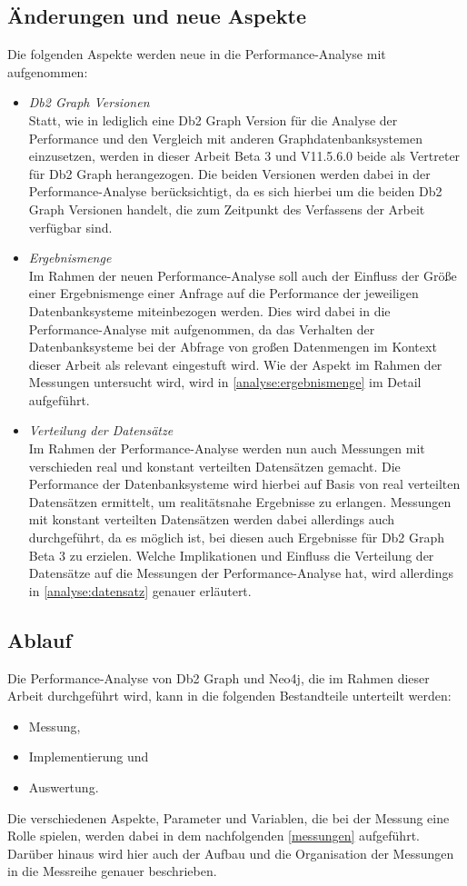\subsection{Änderungen und neue Aspekte}
Die folgenden Aspekte werden neue in die Performance-Analyse mit aufgenommen:
\begin{itemize}
    \item \textit{Db2 Graph Versionen}\\
    Statt, wie in \cite{sigmod_tian} lediglich eine Db2 Graph Version für die Analyse der Performance und den Vergleich mit anderen Graphdatenbanksystemen einzusetzen, werden in dieser Arbeit Beta 3 und V11.5.6.0 beide als Vertreter für Db2 Graph herangezogen. Die beiden Versionen werden dabei in der Performance-Analyse berücksichtigt, da es sich hierbei um die beiden Db2 Graph Versionen handelt, die zum Zeitpunkt des Verfassens der Arbeit verfügbar sind.
    \item \textit{Ergebnismenge}\\
    Im Rahmen der neuen Performance-Analyse soll auch der Einfluss der Größe einer Ergebnismenge einer Anfrage auf die Performance der jeweiligen Datenbanksysteme miteinbezogen werden. Dies wird dabei in die Performance-Analyse mit aufgenommen, da das Verhalten der Datenbanksysteme bei der Abfrage von großen Datenmengen im Kontext dieser Arbeit als relevant eingestuft wird. Wie der Aspekt im Rahmen der Messungen untersucht wird, wird in \autoref{analyse:ergebnismenge} im Detail aufgeführt.
    \item \textit{Verteilung der Datensätze}\\
    Im Rahmen der Performance-Analyse werden nun auch Messungen mit verschieden real und konstant verteilten Datensätzen gemacht. Die Performance der Datenbanksysteme wird hierbei auf Basis von real verteilten Datensätzen ermittelt, um realitätsnahe Ergebnisse zu erlangen. Messungen mit konstant verteilten Datensätzen werden dabei allerdings auch durchgeführt, da es möglich ist, bei diesen auch Ergebnisse für Db2 Graph Beta 3 zu erzielen. Welche Implikationen und Einfluss die Verteilung der Datensätze auf die Messungen der Performance-Analyse hat, wird allerdings in \autoref{analyse:datensatz} genauer erläutert. 
\end{itemize}

\subsection{Ablauf}
Die Performance-Analyse von Db2 Graph und Neo4j, die im Rahmen dieser Arbeit durchgeführt wird, kann in die folgenden Bestandteile unterteilt werden: 
\begin{itemize}
    \item Messung,
    \item Implementierung und 
    \item Auswertung.
\end{itemize}
Die verschiedenen Aspekte, Parameter und Variablen, die bei der Messung eine Rolle spielen, werden dabei in dem nachfolgenden \autoref{messungen} aufgeführt. Darüber hinaus wird hier auch der Aufbau und die Organisation der Messungen in die Messreihe genauer beschrieben. 

